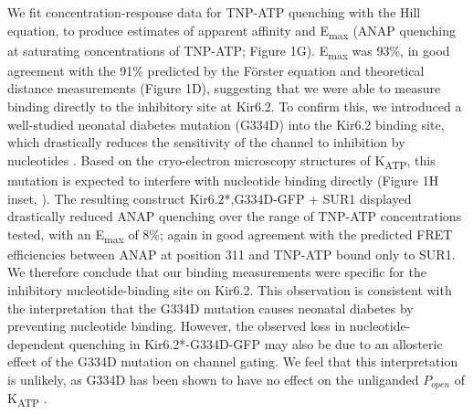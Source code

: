 \documentclass[9pt,lineno, onehalfspacing]{elife_modified}
\begin{document}
We fit concentration-response data for TNP-ATP quenching with the Hill equation, to produce estimates of apparent affinity and E\textsubscript{max} (ANAP quenching at saturating concentrations of TNP-ATP; Figure 1G).
E\textsubscript{max} was 93\%, in good agreement with the 91\% predicted by the Förster equation and theoretical distance measurements (Figure 1D), suggesting that we were able to measure binding directly to the inhibitory site at Kir6.2.
To confirm this, we introduced a well-studied neonatal diabetes mutation (G334D) into the Kir6.2 binding site, which drastically reduces the sensitivity of the channel to inhibition by nucleotides \citep{RN27, RN88, RN28}.
Based on the cryo-electron microscopy structures of K\textsubscript{ATP}, this mutation is expected to interfere with nucleotide binding directly (Figure 1H inset, \cite{RN6}).
The resulting construct Kir6.2*,G334D-GFP + SUR1 displayed drastically reduced ANAP quenching over the range of TNP-ATP concentrations tested, with an E\textsubscript{max} of 8\%; again in good agreement with the predicted FRET efficiencies between ANAP at position 311 and TNP-ATP bound only to SUR1.
We therefore conclude that our binding measurements were specific for the inhibitory nucleotide-binding site on Kir6.2.
This observation is consistent with the interpretation that the G334D mutation causes neonatal diabetes by preventing nucleotide binding.
However, the observed loss in nucleotide-dependent quenching in Kir6.2*-G334D-GFP may also be due to an allosteric effect of the G334D mutation on channel gating.
We feel that this interpretation is unlikely, as G334D has been shown to have no effect on the unliganded $P_{open}$ of K\textsubscript{ATP} \citep{RN28}.
\end{document}
